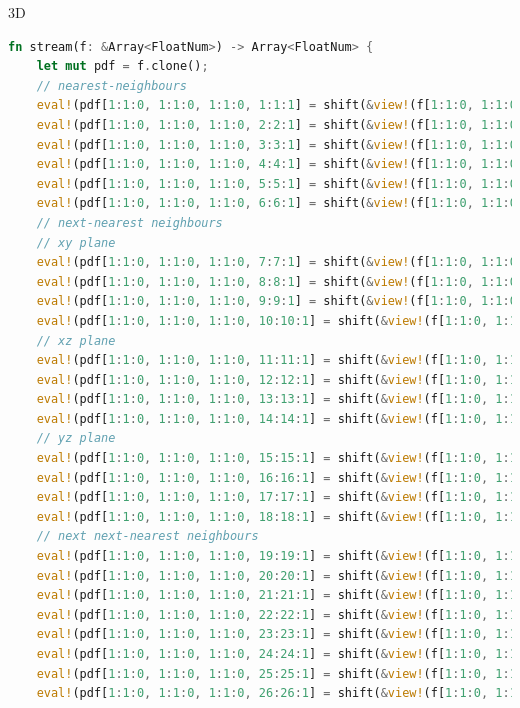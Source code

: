 3D \\

\begin{lstlisting}[language=Rust, caption=Streaming with \texttt{shift} function for three dimensions with 27 discrete speeds (D3Q27)., label=rust-streaming-3d]
fn stream(f: &Array<FloatNum>) -> Array<FloatNum> {
	let mut pdf = f.clone();
	// nearest-neighbours
	eval!(pdf[1:1:0, 1:1:0, 1:1:0, 1:1:1] = shift(&view!(f[1:1:0, 1:1:0, 1:1:0, 1:1:1]), &[ 1, 0, 0, 0]));
	eval!(pdf[1:1:0, 1:1:0, 1:1:0, 2:2:1] = shift(&view!(f[1:1:0, 1:1:0, 1:1:0, 2:2:1]), &[ -1, 0, 0, 0]));
	eval!(pdf[1:1:0, 1:1:0, 1:1:0, 3:3:1] = shift(&view!(f[1:1:0, 1:1:0, 1:1:0, 3:3:1]), &[ 0, 1, 0, 0]));
	eval!(pdf[1:1:0, 1:1:0, 1:1:0, 4:4:1] = shift(&view!(f[1:1:0, 1:1:0, 1:1:0, 4:4:1]), &[ 0, -1, 0, 0]));
	eval!(pdf[1:1:0, 1:1:0, 1:1:0, 5:5:1] = shift(&view!(f[1:1:0, 1:1:0, 1:1:0, 5:5:1]), &[ 0, 0, 1, 0]));
	eval!(pdf[1:1:0, 1:1:0, 1:1:0, 6:6:1] = shift(&view!(f[1:1:0, 1:1:0, 1:1:0, 6:6:1]), &[ 0, 0, -1, 0]));
	// next-nearest neighbours
	// xy plane
	eval!(pdf[1:1:0, 1:1:0, 1:1:0, 7:7:1] = shift(&view!(f[1:1:0, 1:1:0, 1:1:0, 7:7:1]), &[ 1, 1, 0, 0]));
	eval!(pdf[1:1:0, 1:1:0, 1:1:0, 8:8:1] = shift(&view!(f[1:1:0, 1:1:0, 1:1:0, 8:8:1]), &[ -1, 1, 0, 0]));
	eval!(pdf[1:1:0, 1:1:0, 1:1:0, 9:9:1] = shift(&view!(f[1:1:0, 1:1:0, 1:1:0, 9:9:1]), &[ 1, -1, 0, 0]));
	eval!(pdf[1:1:0, 1:1:0, 1:1:0, 10:10:1] = shift(&view!(f[1:1:0, 1:1:0, 1:1:0, 10:10:1]), &[ -1, -1, 0, 0]));
	// xz plane
	eval!(pdf[1:1:0, 1:1:0, 1:1:0, 11:11:1] = shift(&view!(f[1:1:0, 1:1:0, 1:1:0, 11:11:1]), &[ 1, 0, 1, 0]));
	eval!(pdf[1:1:0, 1:1:0, 1:1:0, 12:12:1] = shift(&view!(f[1:1:0, 1:1:0, 1:1:0, 12:12:1]), &[ -1, 0, 1, 0]));
	eval!(pdf[1:1:0, 1:1:0, 1:1:0, 13:13:1] = shift(&view!(f[1:1:0, 1:1:0, 1:1:0, 13:13:1]), &[ 1, 0, -1, 0]));
	eval!(pdf[1:1:0, 1:1:0, 1:1:0, 14:14:1] = shift(&view!(f[1:1:0, 1:1:0, 1:1:0, 14:14:1]), &[ -1, 0, -1, 0]));
	// yz plane
	eval!(pdf[1:1:0, 1:1:0, 1:1:0, 15:15:1] = shift(&view!(f[1:1:0, 1:1:0, 1:1:0, 15:15:1]), &[ 0, 1, 1, 0]));
	eval!(pdf[1:1:0, 1:1:0, 1:1:0, 16:16:1] = shift(&view!(f[1:1:0, 1:1:0, 1:1:0, 16:16:1]), &[ 0, -1, 1, 0]));
	eval!(pdf[1:1:0, 1:1:0, 1:1:0, 17:17:1] = shift(&view!(f[1:1:0, 1:1:0, 1:1:0, 17:17:1]), &[ 0, 1, -1, 0]));
	eval!(pdf[1:1:0, 1:1:0, 1:1:0, 18:18:1] = shift(&view!(f[1:1:0, 1:1:0, 1:1:0, 18:18:1]), &[ 0, -1, -1, 0]));
	// next next-nearest neighbours
	eval!(pdf[1:1:0, 1:1:0, 1:1:0, 19:19:1] = shift(&view!(f[1:1:0, 1:1:0, 1:1:0, 19:19:1]), &[ 1, 1, 1, 0]));
	eval!(pdf[1:1:0, 1:1:0, 1:1:0, 20:20:1] = shift(&view!(f[1:1:0, 1:1:0, 1:1:0, 20:20:1]), &[ -1, 1, 1, 0]));
	eval!(pdf[1:1:0, 1:1:0, 1:1:0, 21:21:1] = shift(&view!(f[1:1:0, 1:1:0, 1:1:0, 21:21:1]), &[ 1, -1, 1, 0]));
	eval!(pdf[1:1:0, 1:1:0, 1:1:0, 22:22:1] = shift(&view!(f[1:1:0, 1:1:0, 1:1:0, 22:22:1]), &[ -1, -1, 1, 0]));
	eval!(pdf[1:1:0, 1:1:0, 1:1:0, 23:23:1] = shift(&view!(f[1:1:0, 1:1:0, 1:1:0, 23:23:1]), &[ 1, 1, -1, 0]));
	eval!(pdf[1:1:0, 1:1:0, 1:1:0, 24:24:1] = shift(&view!(f[1:1:0, 1:1:0, 1:1:0, 24:24:1]), &[ -1, 1, -1, 0]));
	eval!(pdf[1:1:0, 1:1:0, 1:1:0, 25:25:1] = shift(&view!(f[1:1:0, 1:1:0, 1:1:0, 25:25:1]), &[ 1, -1, -1, 0]));
	eval!(pdf[1:1:0, 1:1:0, 1:1:0, 26:26:1] = shift(&view!(f[1:1:0, 1:1:0, 1:1:0, 26:26:1]), &[ -1, -1, -1, 0]));
	

\end{lstlisting}
